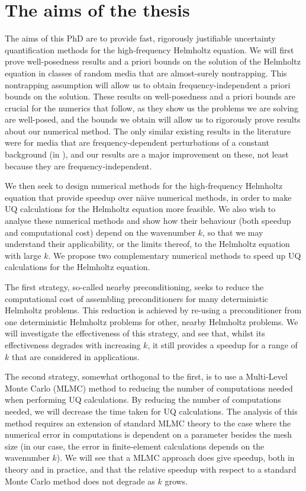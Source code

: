 \section{The aims of the thesis}

The aims of this PhD are to provide fast, rigorously justifiable uncertainty quantification methods for the high-frequency Helmholtz equation. We will first prove well-posedness results and a priori bounds on the solution of the Helmholtz equation in classes of random media that are almost-surely nontrapping. This nontrapping assumption will allow us to obtain frequency-independent a priori bounds on the solution. These results on well-posedness and a priori bounds are crucial for the numerics that follow, as they show us the problems we are solving are well-posed, and the bounds we obtain will allow us to rigorously prove results about our numerical method. The only similar existing results in the literature were for media that are frequency-dependent perturbations of a constant background (in \cite{FeLiLo:15}), and our results are a major improvement on these, not least because they are frequency-independent.

We then seek to design numerical methods for the high-frequency Helmholtz equation that provide speedup over n\"aive numerical methods, in order to make UQ calculations for the Helmholtz equation more feasible. We also wish to analyse these numerical methods and show how their behaviour (both speedup and computational cost) depend on the wavenumber $k$, so that we may understand their applicability, or the limits thereof, to the Helmholtz equation with large $k$. We propose two complementary numerical methods to speed up UQ calculations for the Helmholtz equation.

The first strategy, so-called nearby preconditioning, seeks to reduce the computational cost of assembling preconditioners for many deterministic Helmholtz problems. This reduction is achieved by re-using a preconditioner from one deterministic Helmholtz problems for other, nearby Helmholtz problems. We will investigate the effectiveness of this strategy, and see that, whilst its effectiveness degrades with increasing $k$, it still provides a speedup for a range of $k$ that are considered in applications.

The second strategy, somewhat orthogonal to the first, is to use a Multi-Level Monte Carlo (MLMC) method to reducing the number of computations needed when performing UQ calculations. By reducing the number of computations needed, we will decrease the time taken for UQ calculations. The analysis of this method requires an extension of standard MLMC theory to the case where the numerical error in computations is dependent on a parameter besides the mesh size (in our case, the error in finite-element calculations depends on the wavenumber $k$). We will see that a MLMC approach does give speedup, both in theory and in practice, and that the relative speedup with respect to a standard Monte Carlo method does not degrade as $k$ grows.



